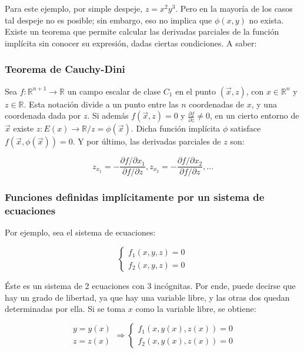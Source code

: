 \documentclass{article}
\renewcommand{\Bbb}{\mathbb}
\begin{document}
Para este ejemplo, por simple despeje, $z = x^2 y^3$. Pero en la mayoría de los casos tal despeje no es posible; sin embargo, eso no implica que $\phi(x,y)$ no exista. Existe un teorema que permite calcular las derivadas parciales de la función implícita sin conocer su expresión, dadas ciertas condiciones. A saber:

\subsubsection{Teorema de Cauchy-Dini}

Sea $f:\Bbb R^{n+1} \rightarrow \Bbb R$ un campo escalar de clase $C_1$ en el punto $(\overrightarrow{x}, z)$, con $x \in \Bbb R^n$ y $z \in \Bbb R$. Esta notación divide a un punto entre las $n$ coordenadas de $x$, y una coordenada dada por $z$. Si además $f(\overrightarrow{x}, z) = 0$ y $\frac{\partial f}{\partial z} \neq 0$, en un cierto entorno de $\overrightarrow{x}$ existe $z:E(x) \rightarrow \Bbb R / z = \phi(\overrightarrow{x})$. Dicha función implícita $\phi$ satisface $f(\overrightarrow{x}, \phi(\overrightarrow{x})) = 0$. Y por último, las derivadas parciales de $z$ son:

\begin{equation}
z_{x_1} = -\frac{\partial f / \partial x_1}{\partial f / \partial z}, z_{x_2} = -\frac{\partial f / \partial x_2}{\partial f / \partial z}, \ldots
\end{equation}

\subsubsection{Funciones definidas implícitamente por un sistema de ecuaciones}

Por ejemplo, sea el sistema de ecuaciones:

\begin{equation}
\left\{
\begin{array}{ll}
f_1(x, y, z) = 0 \\
f_2(x, y, z) = 0
\end{array}
\right.
\end{equation}

Éste es un sistema de 2 ecuaciones con 3 incógnitas. Por ende, puede decirse que hay un grado de libertad, ya que hay una variable libre, y las otras dos quedan determinadas por ella. Si se toma $x$ como la variable libre, se obtiene:

\begin{equation}
\begin{array}{ll}
y = y(x) \\
z = z(x)
\end{array} \Rightarrow
\left\{
\begin{array}{ll}
f_1(x, y(x), z(x)) = 0 \\
f_2(x, y(x), z(x)) = 0
\end{array}
\right.
\end{equation}
\end{document}
